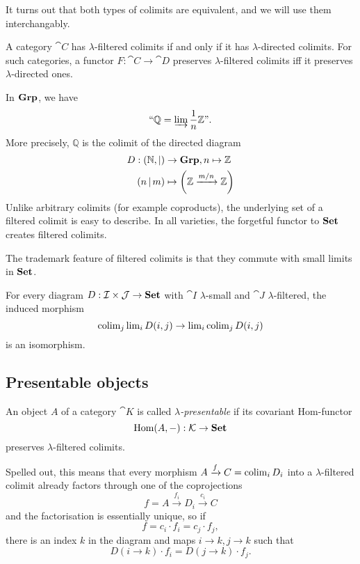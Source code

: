 It turns out that both types of colimits are equivalent, and we will use them interchangably.

\begin{Proposition}A category $\cat C$ has $\lambda$-filtered colimits if and only if it has $\lambda$-directed colimits. For such categories, a functor $F : \cat C \to \cat D$ preserves $\lambda$-filtered colimits iff it preserves $\lambda$-directed ones. \cite[Remark 1.21]{AdamekRosicky}
\end{Proposition}

\begin{Example}\label{ex:Q}
In $\mathbf{Grp}$, we have 
\[ \text{``}\mathbb Q = \varinjlim \frac 1 n \mathbb Z\text{''}. \]
More precisely, $\mathbb Q$ is the colimit of the directed diagram
\begin{align*}
 D : (\mathbb N, |) &\to \mathbf{Grp}, n \mapsto \mathbb Z \\
 (n\, | \,m) &\mapsto \left(\mathbb Z \xrightarrow{m/n} \mathbb Z\right)
\end{align*}
Unlike arbitrary colimits (for example coproducts), the underlying set of a filtered colimit is easy to describe. In all varieties, the forgetful functor to $\mathbf{Set}$ creates filtered colimits.
\end{Example}

The trademark feature of filtered colimits is that they commute with small limits in $\mathbf{Set}$.

\begin{Lemma}\label{prop:smallvsfiltered}
For every diagram $D : \mathcal{I} \times \mathcal{J} \to \mathbf{Set}$ with $\cat I$ $\lambda$-small and $\cat J$ $\lambda$-filtered, the induced morphism
\[ \operatorname{colim}_j \operatorname{lim}_i D(i,j) \to \operatorname{lim}_i \operatorname{colim}_j D(i,j) \]
is an isomorphism. \cite[Theorem 1.2.1]{MakkaiPare}
\end{Lemma}

\subsection{Presentable objects}
\begin{Definition}\label{def:presentableobject}
An object $A$ of a category $\cat K$ is called \emph{$\lambda$-presentable} if its covariant Hom-functor 
\[ \textrm{Hom}(A,-) : \mathcal{K} \to \mathbf{Set} \]
preserves $\lambda$-filtered colimits.
\end{Definition}
Spelled out, this means that every morphism $A \xrightarrow{f} C = \operatorname{colim}_i D_i$ into a $\lambda$-filtered colimit already factors through one of the coprojections
\[ f = A \xrightarrow{f_i} D_i \xrightarrow{c_i} C \]
and the factorisation is essentially unique, so if \[ f = c_i\cdot f_i = c_j \cdot f_j, \]
there is an index $k$ in the diagram and maps $i \to k, j \to k$ such that
\[ D(i \to k)\cdot f_i = D(j \to k) \cdot f_j. \]

